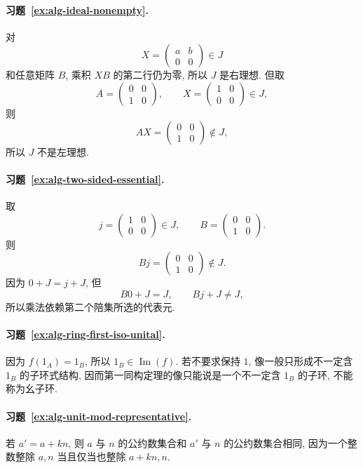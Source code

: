\documentclass[usesamecnt, thmcnt=section, lang=cn, newtx, 10pt, scheme=chinese]{elegantbook}
\begin{document}
\paragraph*{习题~\ref{ex:alg-ideal-nonempty}.}
对
\[
 X=\begin{pmatrix}a&b\\0&0\end{pmatrix}\in J
\]
和任意矩阵 $B$, 乘积 $XB$ 的第二行仍为零, 所以 $J$ 是右理想. 但取
\[
 A=\begin{pmatrix}0&0\\1&0\end{pmatrix},
 \qquad
 X=\begin{pmatrix}1&0\\0&0\end{pmatrix}\in J,
\]
则
\[
 AX=\begin{pmatrix}0&0\\1&0\end{pmatrix}\notin J,
\]
所以 $J$ 不是左理想.

\paragraph*{习题~\ref{ex:alg-two-sided-essential}.}
取
\[
 j=\begin{pmatrix}1&0\\0&0\end{pmatrix}\in J,
 \qquad
 B=\begin{pmatrix}0&0\\1&0\end{pmatrix}.
\]
则
\[
 Bj=\begin{pmatrix}0&0\\1&0\end{pmatrix}\notin J.
\]
因为 $0+J=j+J$, 但
\[
 B0+J=J,
 \qquad
 Bj+J\neq J,
\]
所以乘法依赖第二个陪集所选的代表元.

\paragraph*{习题~\ref{ex:alg-ring-first-iso-unital}.}
因为 $f(1_A)=1_B$, 所以 $1_B\in\operatorname{Im}(f)$. 若不要求保持 $1$, 像一般只形成不一定含 $1_B$ 的子环式结构, 因而第一同构定理的像只能说是一个不一定含 $1_B$ 的子环, 不能称为幺子环.


\paragraph*{习题~\ref{ex:alg-unit-mod-representative}.}
若 $a'=a+kn$, 则 $a$ 与 $n$ 的公约数集合和 $a'$ 与 $n$ 的公约数集合相同, 因为一个整数整除 $a,n$ 当且仅当也整除 $a+kn,n$.
\end{document}
